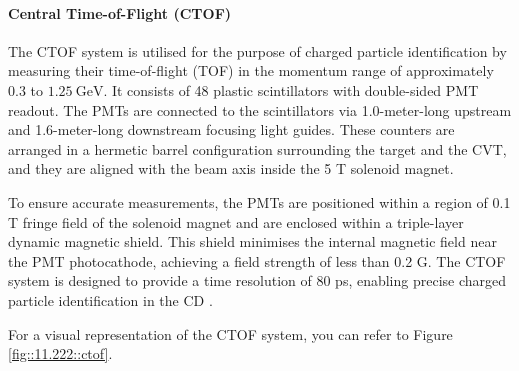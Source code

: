 \paragraph{Central Time-of-Flight (CTOF)}
    The CTOF system is utilised for the purpose of charged particle identification by measuring their time-of-flight (TOF) in the momentum range of approximately $0.3$ to $1.25 ~\text{GeV}$.
    It consists of 48 plastic scintillators with double-sided PMT readout.
    The PMTs are connected to the scintillators via 1.0-meter-long upstream and 1.6-meter-long downstream focusing light guides.
    These counters are arranged in a hermetic barrel configuration surrounding the target and the CVT, and they are aligned with the beam axis inside the 5 T solenoid magnet.

    To ensure accurate measurements, the PMTs are positioned within a region of 0.1 T fringe field of the solenoid magnet and are enclosed within a triple-layer dynamic magnetic shield.
    This shield minimises the internal magnetic field near the PMT photocathode, achieving a field strength of less than 0.2 G.
    The CTOF system is designed to provide a time resolution of 80 ps, enabling precise charged particle identification in the CD \cite{carman2020ctof}.

    For a visual representation of the CTOF system, you can refer to Figure \ref{fig::11.222::ctof}.
